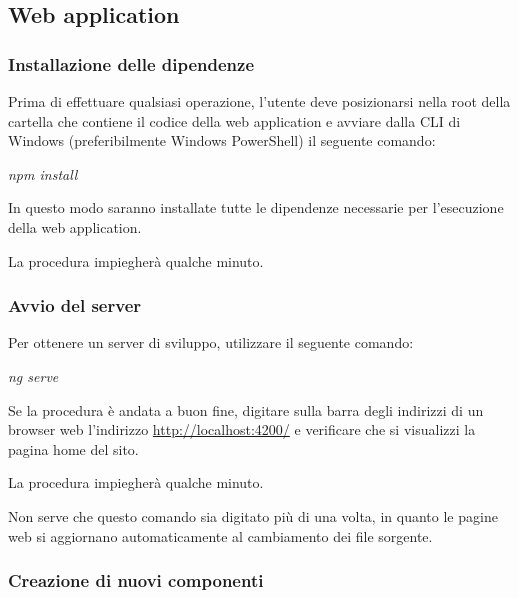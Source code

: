 \documentclass[../manuale-manutentore.tex]{subfiles}
\begin{document}
\subsection{Web application}%
\label{sub:web_application}


\subsubsection{Installazione delle dipendenze}%
\label{subs:installazione_delle_dipendenze}

Prima di effettuare qualsiasi operazione, l'utente deve posizionarsi nella root della cartella che contiene il codice della web application e avviare dalla CLI di Windows (preferibilmente Windows PowerShell) il seguente comando: \par\bigskip

\begin{center}
  \textit{npm install}
\end{center}
\par\bigskip

In questo modo saranno installate tutte le dipendenze necessarie per l'esecuzione della web application.

La procedura impiegherà qualche minuto.

\subsubsection{Avvio del server}%
\label{subs:avvio_del_server}

Per ottenere un server di sviluppo, utilizzare il seguente comando: \par\bigskip

\begin{center}
  \textit{ng serve}
\end{center}
\par\bigskip

Se la procedura è andata a buon fine, digitare sulla barra degli indirizzi di un browser web l'indirizzo \href{http://localhost:4200/}{http://localhost:4200/} e verificare che si visualizzi la pagina home del sito.

La procedura impiegherà qualche minuto.

Non serve che questo comando sia digitato più di una volta, in quanto le pagine web si aggiornano automaticamente al cambiamento dei file sorgente.

\subsubsection{Creazione di nuovi componenti}%
\label{subs:creazione_dei_nuovi_componenti}
\end{document}

